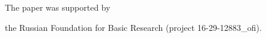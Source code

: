 




  


  


  












 \Ack


  \noindent


   The paper was supported by 


   the Russian Foundation for Basic Research (project 16-29-12883\_ofi).





 








\renewcommand{\bibname}{\protect\rmfamily References}







